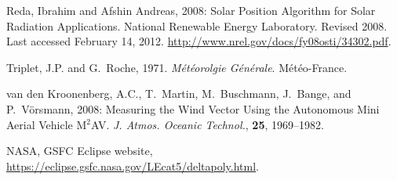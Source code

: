 \documentclass[a4paper,11pt]{report}
\begin{document}
\begin{thebibliography}{5}
 Reda, Ibrahim and Afshin Andreas, 2008: Solar Position Algorithm for Solar Radiation Applications. National Renewable Energy Laboratory. Revised 2008. Last accessed February 14, 2012. \href{http://www.nrel.gov/docs/fy08osti/34302.pdf}{http://www.nrel.gov/docs/fy08osti/34302.pdf}.

 Triplet, J.P. and G.~Roche, 1971. \emph{M\'et\'eorolgie G\'en\'erale}. M\'et\'eo-France.

 van den Kroonenberg, A.C., T.~Martin, M.~Buschmann, J.~Bange, and P.~V\"orsmann, 2008: Measuring the Wind Vector Using the Autonomous Mini Aerial Vehicle M$^2$AV. \emph{J. Atmos. Oceanic Technol.}, \textbf{25}, 1969--1982.

 NASA, GSFC Eclipse website, \href{https://eclipse.gsfc.nasa.gov/LEcat5/deltapoly.html}{https://eclipse.gsfc.nasa.gov/LEcat5/deltapoly.html}.


\end{thebibliography}
\end{document}
